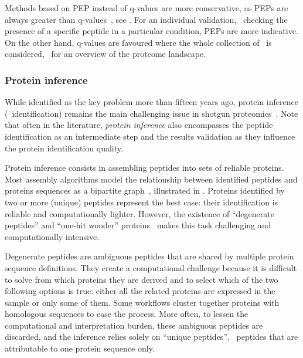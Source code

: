 Methods based on \gls{PEP} instead of q-values are more conservative,
as \glspl{PEP} are always greater than q-values~,
see .
For an individual validation,
\eg\ checking the presence of a specific peptide in a particular condition,
\glspl{PEP} are more indicative.
On the other hand, q-values are favoured
where the whole collection of \psms\ is considered,
\eg\ for an overview of the proteome landscape.~

\subsubsection{Protein inference}\label{subsec:proteinInference}

While identified as the key problem more than fifteen years ago,
protein inference (\ie\ identification) remains
the main challenging issue in shotgun proteomics~.
Note that often in the literature,
\emph{protein inference} also encompasses
the peptide identification as an intermediate step
and the results validation
as they influence the protein identification quality.

Protein inference consists
in assembling peptides into sets of reliable proteins.
Most assembly algorithms model
the relationship between identified peptides and proteins sequences
as a bipartite graph~, illustrated in .
Proteins identified by two or more (unique) peptides represent the best case:
their identification is reliable and computationally lighter.
However,
the existence of \enquote{degenerate peptides} and
\enquote{one-hit wonder} proteins~ makes
this task challenging and computationally intensive.

Degenerate peptides are ambiguous peptides
that are shared by multiple protein sequence definitions.
They create a computational challenge
because it is difficult
to solve from which proteins they are derived
and to select which of the two following options is true:
either all the related proteins are expressed in the sample
or only some of them.
Some workflows cluster together proteins with homologous sequences
to ease the process.
More often, to lessen the computational and interpretation burden,
these ambiguous peptides are discarded, and
the inference relies solely on \enquote{unique peptides},
\ie\ peptides that are attributable to one protein sequence only.

